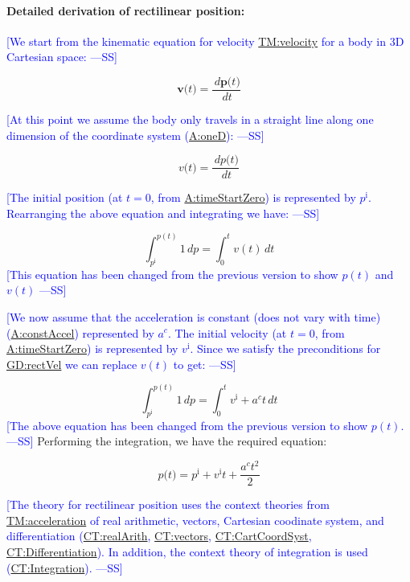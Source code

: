 \documentclass[12pt]{article}
\newcommand{\authornote}[3]{\textcolor{#1}{[#3 ---#2]}}
\newcommand{\authornote}[3]{}
\newcommand{\wss}[1]{\authornote{blue}{SS}{#1}}
\begin{document}
\paragraph{Detailed derivation of rectilinear position:}
\label{GD:rectPosDeriv}
\wss{We start from the kinematic equation for velocity
\hyperref[TM:velocity]{TM:velocity} for a body in 3D Cartesian space:}

$$\symbf{v}\text{(}t\text{)}=\frac{\,d\symbf{p}\text{(}t\text{)}}{\,dt}$$

\wss{At this point we assume the body only travels in a straight line along one
dimension of the coordinate system (\hyperref[oneD]{A:oneD}):}

$${v}\text{(}t\text{)}=\frac{\,d{p}\text{(}t\text{)}}{\,dt}$$

\wss{The initial position (at $t=0$, from
\hyperref[timeStartZero]{A:timeStartZero}) is represented by ${p^{\text{i}}}$.
Rearranging the above equation and integrating we have:}

\begin{displaymath}
\int_{{p^{\text{i}}}}^{p(t)}{1}\,dp=\int_{0}^{t}{v(t)}\,dt
\end{displaymath}
\wss{This equation has been changed from the previous version to show $p(t)$ and
$v(t)$}

\wss{We now assume that the acceleration is constant (does not vary with time)
(\hyperref[constAccel]{A:constAccel}) represented by ${a^{c}}$. The initial
velocity (at $t=0$, from \hyperref[timeStartZero]{A:timeStartZero}) is
represented by ${v^{\text{i}}}$. Since we satisfy the preconditions for
\hyperref[GD:rectVel]{GD:rectVel} we can replace $v(t)$ to get:}

\begin{displaymath}
\int_{{p^{\text{i}}}}^{p(t)}{1}\,dp=\int_{0}^{t}{{v^{\text{i}}}+{a^{c}} t}\,dt
\end{displaymath}
\wss{The above equation has been changed from the previous version to show
$p(t)$.}
Performing the integration, we have the required equation:

\begin{displaymath}
p\text{(}t\text{)}={p^{\text{i}}}+{v^{\text{i}}} t+\frac{{a^{c}} t^{2}}{2}
\end{displaymath}

\wss{The theory for rectilinear position uses the context theories from
\hyperref[TM:acceleration]{TM:acceleration} of real arithmetic, vectors,
Cartesian coodinate system, and differentiation
(\hyperref[CT:realArith]{CT:realArith}, \hyperref[CT:vectors]{CT:vectors},
\hyperref[CT:CartCoordSyst]{CT:CartCoordSyst},
\hyperref[CT:Differentiation]{CT:Differentiation}).  In addition, the context
theory of integration is used (\hyperref[CT:Integration]{CT:Integration}).}
\end{document}
